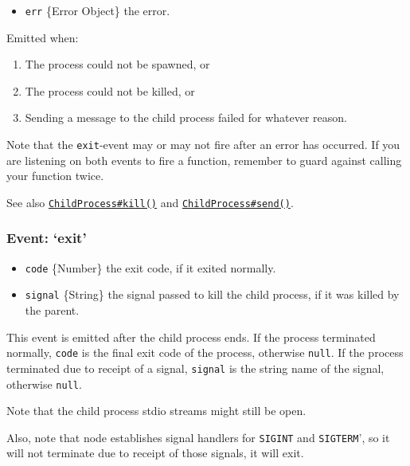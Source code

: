 \begin{itemize}
\itemsep1pt\parskip0pt
\item
  \texttt{err} \{Error Object\} the error.
\end{itemize}

Emitted when:

\begin{enumerate}
\def\labelenumi{\arabic{enumi}.}
\itemsep1pt\parskip0pt
\item
  The process could not be spawned, or
\item
  The process could not be killed, or
\item
  Sending a message to the child process failed for whatever reason.
\end{enumerate}

Note that the \texttt{exit}-event may or may not fire after an error has
occurred. If you are listening on both events to fire a function,
remember to guard against calling your function twice.

See also
\hyperref[childux5fprocessux5fchildux5fkillux5fsignal]{\texttt{ChildProcess\#kill()}}
and
\hyperref[childux5fprocessux5fchildux5fsendux5fmessageux5fsendhandle]{\texttt{ChildProcess\#send()}}.

\subsubsection{\texorpdfstring{Event:
`exit'}{Event: exit}}\label{event-exit}

\begin{itemize}
\itemsep1pt\parskip0pt
\item
  \texttt{code} \{Number\} the exit code, if it exited normally.
\item
  \texttt{signal} \{String\} the signal passed to kill the child
  process, if it was killed by the parent.
\end{itemize}

This event is emitted after the child process ends. If the process
terminated normally, \texttt{code} is the final exit code of the
process, otherwise \texttt{null}. If the process terminated due to
receipt of a signal, \texttt{signal} is the string name of the signal,
otherwise \texttt{null}.

Note that the child process stdio streams might still be open.

Also, note that node establishes signal handlers for
\texttt{\textquotesingle{}SIGINT\textquotesingle{}} and
\texttt{\textquotesingle{}SIGTERM}', so it will not terminate due to
receipt of those signals, it will exit.

